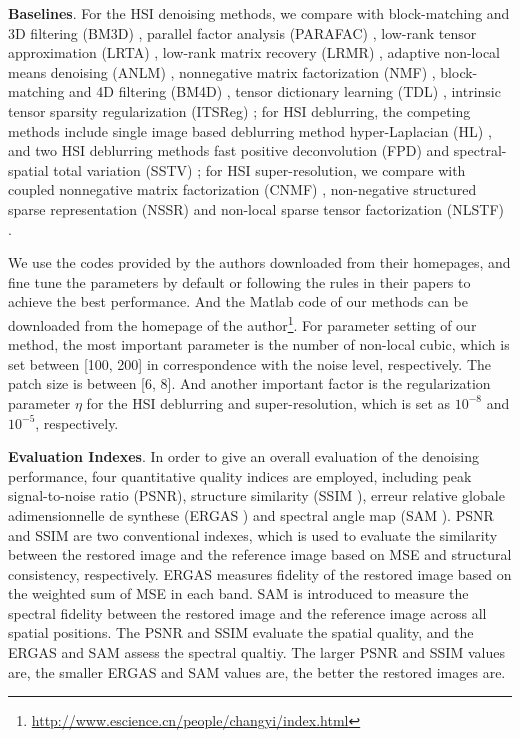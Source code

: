 \documentclass[twocolumn]{svjour3}          %
\begin{document}
    \noindent
    \textbf{Baselines}. For the HSI denoising methods, we compare with block-matching and 3D filtering (BM3D) \cite{dabov2007image}, parallel factor analysis (PARAFAC) \cite{liu2012denoising}, low-rank tensor approximation (LRTA) \cite{renard2008denoising}, low-rank matrix recovery (LRMR) \cite{zhang2014hyperspectral}, adaptive non-local means denoising (ANLM) \cite{manjon2010adaptive}, nonnegative matrix factorization (NMF) \cite{ye2015multitask}, block-matching and 4D filtering (BM4D) \cite{Maggioni2012Nonlocal}, tensor dictionary learning (TDL) \cite{peng2014decomposable}, intrinsic tensor sparsity regularization  (ITSReg) \cite{xie2016multispectral}; for HSI deblurring, the competing methods include single image based deblurring method hyper-Laplacian (HL) \cite{krishnan2009fast}, and two HSI deblurring methods fast positive deconvolution (FPD) \cite{henrot2013fast} and spectral-spatial total variation (SSTV) \cite{fang2017hyperspectral}; for HSI super-resolution, we compare with coupled nonnegative matrix factorization (CNMF) \cite{yokoya2012coupled}, non-negative structured sparse representation (NSSR) \cite{dong2016hyperspectral} and non-local sparse tensor factorization (NLSTF) \cite{dian2017hyperspectral}.

    We use the codes provided by the authors downloaded from their homepages, and fine tune the parameters by default or following the rules in their papers to achieve the best performance. And the Matlab code of our methods can be downloaded from the homepage of the author\footnote{\url{http://www.escience.cn/people/changyi/index.html}}. For parameter setting of our method, the most important parameter is the number of non-local cubic, which is set between [100, 200] in correspondence with the noise level, respectively. The patch size is between [6, 8]. And another important factor is the regularization parameter $\eta$ for the HSI deblurring and super-resolution, which is set as ${10^{ - 8}}$ and ${10^{ - 5}}$, respectively.

    \noindent
    \textbf{Evaluation Indexes}. In order to give an overall evaluation of the denoising performance, four quantitative quality indices are employed, including peak signal-to-noise ratio (PSNR), structure similarity (SSIM \cite{wang2004image}), erreur relative globale adimensionnelle de synthese (ERGAS \cite{wald2002data}) and spectral angle map (SAM \cite{yuhas1993determination}). PSNR and SSIM are two conventional indexes, which is used to evaluate the similarity between the restored image and the reference image based on MSE and structural consistency, respectively. ERGAS measures fidelity of the restored image based on the weighted sum of MSE in each band. SAM is introduced to measure the spectral fidelity between the restored image and the reference image across all spatial positions. The PSNR and SSIM evaluate the spatial quality, and the ERGAS and SAM assess the spectral qualtiy.  The larger PSNR and SSIM values are, the smaller ERGAS and SAM values are, the better the restored images are.
\end{document}
